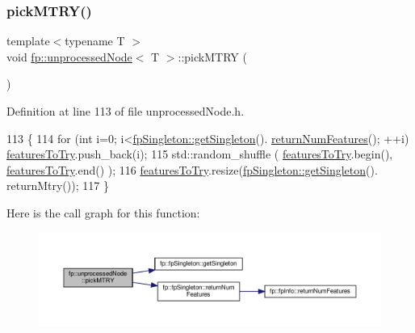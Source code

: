\mbox{\label{classfp_1_1unprocessedNode_a5302bdd3ad2b0de3e2fcd8ed1bf58f61}} 
\subsubsection{\texorpdfstring{pick\+M\+T\+R\+Y()}{pickMTRY()}}
{\footnotesize\ttfamily template$<$typename T $>$ \\
void \hyperlink{classfp_1_1unprocessedNode}{fp\+::unprocessed\+Node}$<$ T $>$\+::pick\+M\+T\+RY (\begin{DoxyParamCaption}{ }\end{DoxyParamCaption})\hspace{0.3cm}{\ttfamily [inline]}}



Definition at line 113 of file unprocessed\+Node.\+h.


\begin{DoxyCode}
113                                       \{
114                     \textcolor{keywordflow}{for} (\textcolor{keywordtype}{int} i=0; i<\hyperlink{classfp_1_1fpSingleton_a8bdae77b68521003e3fc630edec2e240}{fpSingleton::getSingleton}().
      \hyperlink{classfp_1_1fpSingleton_a97cbcad5ae9daa8c747fd4db84928c20}{returnNumFeatures}(); ++i) \hyperlink{classfp_1_1unprocessedNode_a3cffd07402568c03834d0a1248f3a6e3}{featuresToTry}.push\_back(i);
115                     std::random\_shuffle ( \hyperlink{classfp_1_1unprocessedNode_a3cffd07402568c03834d0a1248f3a6e3}{featuresToTry}.begin(), 
      \hyperlink{classfp_1_1unprocessedNode_a3cffd07402568c03834d0a1248f3a6e3}{featuresToTry}.end() );
116                     \hyperlink{classfp_1_1unprocessedNode_a3cffd07402568c03834d0a1248f3a6e3}{featuresToTry}.resize(\hyperlink{classfp_1_1fpSingleton_a8bdae77b68521003e3fc630edec2e240}{fpSingleton::getSingleton}().
      returnMtry());
117                 \}
\end{DoxyCode}
Here is the call graph for this function\+:\nopagebreak
\begin{figure}[H]
\begin{center}
\leavevmode
\includegraphics[width=350pt]{classfp_1_1unprocessedNode_a5302bdd3ad2b0de3e2fcd8ed1bf58f61_cgraph}
\end{center}
\end{figure}
\mbox{\label{classfp_1_1unprocessedNode_ace7db1655a4f21d4d39c989ff1db806b}} 
